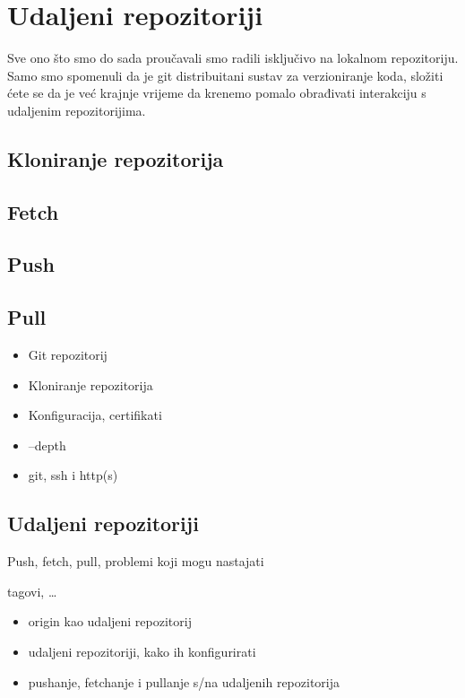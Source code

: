 \chapter*{Udaljeni repozitoriji}

Sve ono što smo do sada proučavali smo radili isključivo na lokalnom repozitoriju.
Samo smo spomenuli da je git distribuitani sustav za verzioniranje koda, složiti ćete se da je već krajnje vrijeme da krenemo pomalo obrađivati interakciju s udaljenim repozitorijima.

\section*{Kloniranje repozitorija}

\section*{Fetch}

\section*{Push}

\section*{Pull}

\begin{itemize}
   \item Git repozitorij
   \item Kloniranje repozitorija
   \item Konfiguracija, certifikati
   \item --depth
   \item git, ssh i http(s)
\end{itemize}

\section*{Udaljeni repozitoriji}

Push, fetch, pull, problemi koji mogu nastajati

tagovi, \dots

\begin{itemize}
   \item origin kao udaljeni repozitorij
   \item udaljeni repozitoriji, kako ih konfigurirati
   \item pushanje, fetchanje i pullanje s/na udaljenih repozitorija
\end{itemize}


